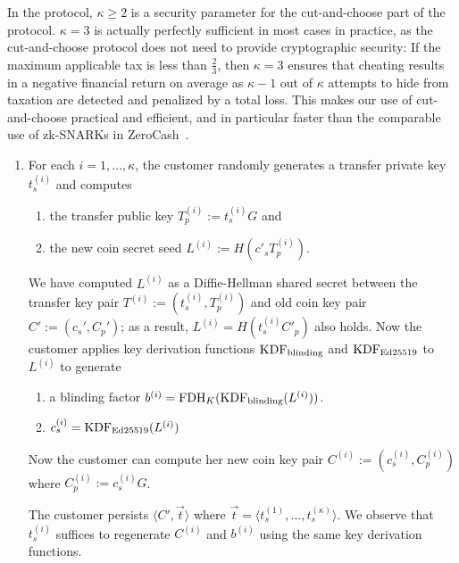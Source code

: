 \documentclass[sigconf, authordraft]{acmart}
\begin{document}
In the protocol, $\kappa \ge 2$ is a security parameter for the
cut-and-choose part of the protocol.  $\kappa = 3$ is actually
perfectly sufficient in most cases in practice, as the cut-and-choose
protocol does not need to provide cryptographic security: If the
maximum applicable tax is less than $\frac{2}{3}$, then $\kappa = 3$
ensures that cheating results in a negative financial return on
average as $\kappa - 1$ out of $\kappa$ attempts to hide from taxation
are detected and penalized by a total loss.  This makes our use of
cut-and-choose practical and efficient, and in particular faster
than the comparable use of zk-SNARKs in ZeroCash~\cite{zerocash}.


\begin{enumerate}
\item %
    For each $i = 1,\ldots,\kappa$, the customer randomly generates
    a transfer private key $t^{(i)}_s$ and computes
    \begin{enumerate}
    \item the transfer public key $T^{(i)}_p := t^{(i)}_s G$ and
    \item the new coin secret seed $L^{(i)} := H(c'_s T_p^{(i)})$.
    \end{enumerate}
    We have computed $L^{(i)}$ as a Diffie-Hellman shared secret between
    the transfer key pair $T^{(i)} := \left(t^{(i)}_s,T^{(i)}_p\right)$
    and old coin key pair $C' := \left(c_s', C_p'\right)$;
    as a result, $L^{(i)} = H(t^{(i)}_s C'_p)$ also holds.
    Now the customer applies key derivation functions $\textrm{KDF}_{\textrm{blinding}}$ and $\textrm{KDF}_{\textrm{Ed25519}}$ to $L^{(i)}$ to generate
    \begin{enumerate}
      \item a blinding factor $b^{(i)} = \textrm{FDH}_K(\textrm{KDF}_{\textrm{blinding}}(L^{(i)}))$.
      \item $c_s^{(i)} = \textrm{KDF}_{\textrm{Ed25519}}(L^{(i)})$
    \end{enumerate}
    Now the customer can compute her new coin key pair
     $C^{(i)} := \left(c_s^{(i)}, C_p^{(i)}\right)$
     where $C^{(i)}_p := c^{(i)}_s G$.

    The customer persists $\langle C', \vec{t}\rangle$ where
    $\vec{t} = \langle t^{(1)}_s, \ldots, t^{(\kappa)}_s \rangle$.
    We observe that $t^{(i)}_s$ suffices to regenerate $C^{(i)}$ and $b^{(i)}$
    using the same key derivation functions.


\end{enumerate}
\end{document}

